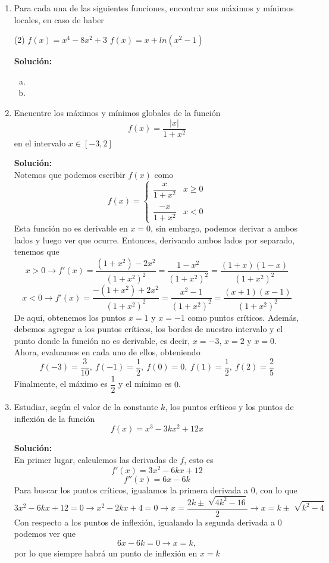 \documentclass[12pt]{article}
\newenvironment{solucion}
{\begin{mdframed}[backgroundcolor=black!10]
		{\bf Solución:}\\
	}
	{
	\end{mdframed}
}
\newenvironment{preguntas}
{\begin{enumerate}\itemsep12pt
	}
	{
	\end{enumerate}
}
\newcommand{\ra}{\rightarrow}
\begin{document}
\begin{preguntas}
\item Para cada una de las siguientes funciones, encontrar sus máximos y mínimos locales, en caso de haber
\begin{tasks}(2)
\task $f(x) = x^4 - 8x^2 + 3$
\task $f(x)=x+ln(x^2-1)$
\end{tasks}
\begin{solucion}

\begin{enumerate}[a)]
\item 
\item 
\end{enumerate}
\end{solucion}
\item Encuentre los máximos y mínimos globales de la función
$$f(x) = \dfrac{|x|}{1+x^2}$$
en el intervalo $x \in [-3,2]$
\begin{solucion}
Notemos que podemos escribir $f(x)$ como
$$f(x)= \begin{cases}
\dfrac{x}{1+x^2} & x \geq 0\\\\
\dfrac{-x}{1+x^2} & x < 0
\end{cases}$$
Esta función no es derivable en $x=0$, sin embargo, podemos derivar a ambos lados y luego ver que ocurre. Entonces, derivando ambos lados por separado, tenemos que
$$x > 0 \ra f'(x) = \dfrac{(1+x^2) - 2x^2}{(1+x^2)^2} = \dfrac{1-x^2}{(1+x^2)^2} = \dfrac{(1+x)(1-x)}{(1+x^2)^2}$$
$$x < 0 \ra f'(x) = \dfrac{-(1+x^2) + 2x^2}{(1+x^2)^2} = \dfrac{x^2-1}{(1+x^2)^2} = \dfrac{(x+1)(x-1)}{(1+x^2)^2}$$
De aquí, obtenemos los puntos $x=1$ y $x=-1$ como puntos críticos. Además, debemos agregar a los puntos críticos, los bordes de nuestro intervalo y el punto donde la función no es derivable, es decir, $x=-3$, $x=2$ y $x=0$.\\

Ahora, evaluamos en cada uno de ellos, obteniendo
$$f(-3) = \dfrac{3}{10},\ f(-1) = \dfrac{1}{2}, \ f(0) = 0, \ f(1) = \dfrac{1}{2}, \ f(2) = \dfrac{2}{5}$$
Finalmente, el máximo es $\dfrac{1}{2}$ y el mínimo es $0$.
\end{solucion}
\item Estudiar, según el valor de la constante $k$, los puntos críticos y los puntos de inflexión de la función
$$f(x) = x^3-3kx^2+12x$$
\begin{solucion}
En primer lugar, calculemos las derivadas de $f$, esto es
$$f'(x) = 3x^2 - 6kx + 12$$
$$f''(x) = 6x - 6k$$
Para buscar los puntos críticos, igualamos la primera derivada a 0, con lo que
$$3x^2 - 6kx + 12 = 0 \ra x^2 - 2kx + 4= 0 \ra x = \dfrac{2k \pm \sqrt[]{4k^2-16}}{2} \ra x = k \pm \sqrt[]{k^2-4}$$
Con respecto a los puntos de inflexión, igualando la segunda derivada a 0 podemos ver que
$$6x- 6k = 0 \ra x = k,$$
por lo que siempre habrá un punto de inflexión en $x=k$\\


\end{solucion}
\end{preguntas}
\end{document}
